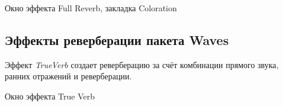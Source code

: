 \documentclass{beamer}
\begin{document}
\begin{frame}
  \begin{block}{Окно эффекта Full Reverb, закладка Coloration}
  \end{block}
\end{frame}

\subsection{Эффекты реверберации пакета Waves}
\begin{frame}
  Эффект \emph{TrueVerb} создает реверберацию за счёт комбинации прямого звука, ранних отражений и реверберации.

  \begin{block}{Окно эффекта True Verb}
  \end{block}
\end{frame}
\end{document}
